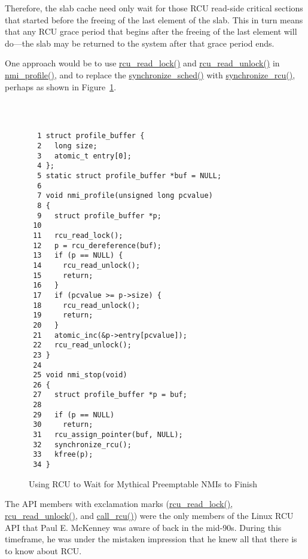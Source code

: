 	Therefore, the slab cache need only wait for those RCU read-side
	critical sections that started before the freeing of the last element
	of the slab.
	This in turn means that any RCU grace period that begins after
	the freeing of the last element will do---the slab may be returned
	to the system after that grace period ends.


One approach would be to use
\url{rcu_read_lock()} and \url{rcu_read_unlock()}
in \url{nmi_profile()}, and to replace the
\url{synchronize_sched()} with \url{synchronize_rcu()},
perhaps as shown in
Figure~\ref{fig:defer:Using RCU to Wait for Mythical Preemptable NMIs to Finish}.
\\ ~ \\
\begin{figure}[tbp]
{ \tt \scriptsize
\begin{verbatim}
  1 struct profile_buffer {
  2   long size;
  3   atomic_t entry[0];
  4 };
  5 static struct profile_buffer *buf = NULL;
  6 
  7 void nmi_profile(unsigned long pcvalue)
  8 {
  9   struct profile_buffer *p;
 10 
 11   rcu_read_lock();
 12   p = rcu_dereference(buf);
 13   if (p == NULL) {
 14     rcu_read_unlock();
 15     return;
 16   }
 17   if (pcvalue >= p->size) {
 18     rcu_read_unlock();
 19     return;
 20   }
 21   atomic_inc(&p->entry[pcvalue]);
 22   rcu_read_unlock();
 23 }
 24 
 25 void nmi_stop(void)
 26 {
 27   struct profile_buffer *p = buf;
 28 
 29   if (p == NULL)
 30     return;
 31   rcu_assign_pointer(buf, NULL);
 32   synchronize_rcu();
 33   kfree(p);
 34 }
\end{verbatim}
}
\caption{Using RCU to Wait for Mythical Preemptable NMIs to Finish}
\label{fig:defer:Using RCU to Wait for Mythical Preemptable NMIs to Finish}
\end{figure}



	The API members with exclamation marks (\url{rcu_read_lock()},
	\url{rcu_read_unlock()}, and \url{call_rcu()}) were the
	only members of the Linux RCU API that Paul E. McKenney was aware
	of back in the mid-90s.
	During this timeframe, he was under the mistaken impression that
	he knew all that there is to know about RCU.


